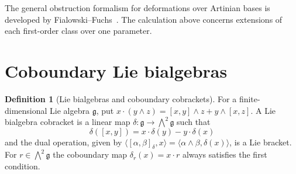 \documentclass[11pt,oneside,openany]{book}
\theoremstyle{definition}
\newtheorem{definition}[theorem]{Definition}
\theoremstyle{remark}
\begin{document}
The general obstruction formalism for deformations over Artinian
bases is developed by Fialowski--Fuchs~\cite[Sections 1 and 3]{fialowski-fuchs}.
The calculation above concerns extensions of each first-order class
over one parameter.

\section{Coboundary Lie bialgebras}

\begin{definition}[Lie bialgebras and coboundary cobrackets]
\label{res:LD04}
For a finite-dimensional Lie algebra \(\mathfrak g\), put
\(x\cdot(y\wedge z)=[x,y]\wedge z+y\wedge[x,z]\).
A Lie bialgebra cobracket is a linear map
\(\delta:\mathfrak g\to\bigwedge^2\mathfrak g\)
such that
\[
 \delta([x,y])=x\cdot\delta(y)-y\cdot\delta(x)
\]
and the dual operation, given by
\(\langle[\alpha,\beta]_\delta,x\rangle
=\langle\alpha\wedge\beta,\delta(x)\rangle\), is a Lie bracket.
For \(r\in\bigwedge^2\mathfrak g\) the coboundary map
\(\delta_r(x)=x\cdot r\) always satisfies the first condition.
\end{definition}
\end{document}
